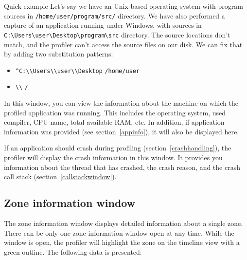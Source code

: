 \documentclass[hidelinks,titlepage,a4paper]{article}
\begin{document}
\begin{bclogo}[
noborder=true,
couleur=black!5,
logo=\bclampe
]{Quick example}
Let's say we have an Unix-based operating system with program sources in \texttt{/home/user/program/src/} directory. We have also performed a capture of an application running under Windows, with sources in \texttt{C:\textbackslash{}Users\textbackslash{}user\textbackslash{}Desktop\textbackslash{}program\textbackslash{}src} directory. The source locations don't match, and the profiler can't access the source files on our disk. We can fix that by adding two substitution patterns:

\begin{itemize}
\item \texttt{\^{}C:\textbackslash{}\textbackslash{}Users\textbackslash{}\textbackslash{}user\textbackslash{}\textbackslash{}Desktop} \hspace{1em}\textrightarrow\hspace{1em} \texttt{/home/user}
\item \texttt{\textbackslash{}\textbackslash{}} \hspace{1em}\textrightarrow\hspace{1em} \texttt{/}
\end{itemize}
\end{bclogo}

In this window, you can view the information about the machine on which the profiled application was running. This includes the operating system, used compiler, CPU name, total available RAM, etc. In addition, if application information was provided (see section~\ref{appinfo}), it will also be displayed here.

If an application should crash during profiling (section~\ref{crashhandling}), the profiler will display the crash information in this window. It provides you information about the thread that has crashed, the crash reason, and the crash call stack (section~\ref{callstackwindow}).

\subsection{Zone information window}
\label{zoneinfo}

The zone information window displays detailed information about a single zone. There can be only one zone information window open at any time. While the window is open, the profiler will highlight the zone on the timeline view with a green outline. The following data is presented:
\end{document}

